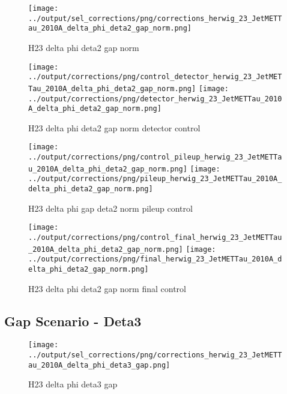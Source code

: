 \documentclass[11pt]{book}
\begin{document}
\begin{figure}[ht]
\centering
\texttt{[image: ../output/sel\_corrections/png/corrections\_herwig\_23\_JetMETTau\_2010A\_delta\_phi\_deta2\_gap\_norm.png]}
\caption{H23 delta phi deta2 gap norm}
\label{fig:H23_JetMETTau_2010A_delta_phi_deta2_gap_norm}
\end{figure}


\begin{figure}[ht]
\centering
\texttt{[image: ../output/corrections/png/control\_detector\_herwig\_23\_JetMETTau\_2010A\_delta\_phi\_deta2\_gap\_norm.png]}
\texttt{[image: ../output/corrections/png/detector\_herwig\_23\_JetMETTau\_2010A\_delta\_phi\_deta2\_gap\_norm.png]}
\caption{H23 delta phi deta2 gap norm detector control}
\label{fig:H23_JetMETTau_2010A_delta_phi_deta2_gap_norm_detector_control}
\end{figure}

\begin{figure}[ht]
\centering
\texttt{[image: ../output/corrections/png/control\_pileup\_herwig\_23\_JetMETTau\_2010A\_delta\_phi\_deta2\_gap\_norm.png]}
\texttt{[image: ../output/corrections/png/pileup\_herwig\_23\_JetMETTau\_2010A\_delta\_phi\_deta2\_gap\_norm.png]}
\caption{H23 delta phi gap deta2 norm pileup control}
\label{fig:H23_JetMETTau_2010A_delta_phi_deta2_gap_norm_pileup_control}
\end{figure}


\begin{figure}[ht]
\centering
\texttt{[image: ../output/corrections/png/control\_final\_herwig\_23\_JetMETTau\_2010A\_delta\_phi\_deta2\_gap\_norm.png]}
\texttt{[image: ../output/corrections/png/final\_herwig\_23\_JetMETTau\_2010A\_delta\_phi\_deta2\_gap\_norm.png]}
\caption{H23 delta phi deta2 gap norm final control}
\label{fig:H23_JetMETTau_2010A_delta_phi_deta2_gap_norm_final_control}
\end{figure}


\clearpage
\subsection{Gap Scenario - Deta3}

\begin{figure}[ht]
\centering
\texttt{[image: ../output/sel\_corrections/png/corrections\_herwig\_23\_JetMETTau\_2010A\_delta\_phi\_deta3\_gap.png]}
\caption{H23 delta phi deta3 gap}
\label{fig:H23_JetMETTau_2010A_delta_phi_deta3_gap}
\end{figure}
\end{document}
